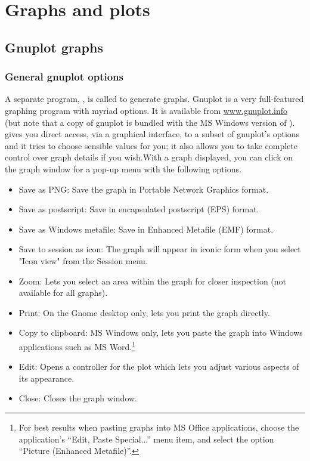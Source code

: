 \chapter{Graphs and plots}
\label{chap-graphs}



\section{Gnuplot graphs}
\label{gnuplot-graphs}



\subsection{General gnuplot options}
\label{gnuplot-opts}

A separate program, , is called to generate graphs.
Gnuplot is a very full-featured graphing program with myriad options.
It is available from \href{http://www.gnuplot.info/}{www.gnuplot.info}
(but note that a copy of gnuplot is bundled with the MS Windows
version of ).   gives you direct access, via a
graphical interface, to a subset of gnuplot's options and it tries to
choose sensible values for you; it also allows you to take complete
control over graph details if you wish.With a graph displayed, you can
click on the graph window for a pop-up menu with the following
options.

\begin{itemize}
\item \textsf{Save as PNG}: Save the graph in Portable Network
  Graphics format.
\item \textsf{Save as postscript}: Save in encapsulated postscript
  (EPS) format.
\item \textsf{Save as Windows metafile}: Save in Enhanced Metafile
  (EMF) format.
\item \textsf{Save to session as icon}: The graph will appear in
  iconic form when you select "Icon view" from the Session menu.
\item \textsf{Zoom}: Lets you select an area within the graph for
  closer inspection (not available for all graphs).
\item \textsf{Print}: On the Gnome desktop only, lets you print the
  graph directly.
\item \textsf{Copy to clipboard}: MS Windows only, lets you paste the
  graph into Windows applications such as MS Word.\footnote{For best
    results when pasting graphs into MS Office applications, choose
    the application's ``Edit, Paste Special...'' menu item, and select
    the option ``Picture (Enhanced Metafile)''.}
\item \textsf{Edit}: Opens a controller for the plot which lets you
  adjust various aspects of its appearance.
\item \textsf{Close}: Closes the graph window.
\end{itemize}


